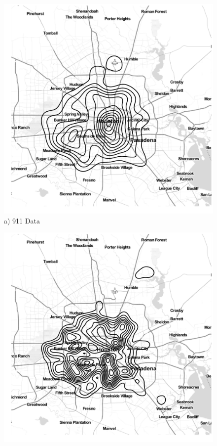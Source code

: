 \documentclass[final]{statsoc}
\begin{document}
\begin{figure}
  \centering
  \begin{minipage}[t]{0.49\textwidth}
    \centering
    \includegraphics[width=1.0\textwidth]{./imgs/911_contours.pdf}
    \\
    a) 911 Data
    \\
  \end{minipage}
  \hfill
  \begin{minipage}[t]{0.49\textwidth}
    \centering
    \includegraphics[width=1.0\textwidth]{./imgs/mortality_contours.pdf}

\end{minipage}
\end{figure}
\end{document}
